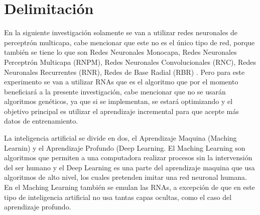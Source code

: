 \section{Delimitación}
\label{sec:delimitation}

    En la siguiente investigación solamente se van a utilizar redes neuronales de perceptr\'on multicapa, 
    cabe mencionar que este no es el único tipo de red, porque también se tiene lo que son Redes Neuronales Monocapa,
    Redes Neuronales Perceptrón Multicapa (RNPM), Redes Neuronales Convolucionales (RNC), Redes Neuronales Recurrentes (RNR),
    Redes de Base Radial (RBR) \cite{royo2021}. Pero para este experimento se van a utilizar RNAs que es el algoritmo que 
    por el momento beneficiar\'a a la presente investigación, cabe mencionar que no se usar\'an algoritmos genéticos, 
    ya que si se implementan, se estará optimizando y el objetivo principal es utilizar el aprendizaje incremental 
    para que acepte más datos de entrenamiento.
    
    La inteligencia artificial se divide en dos, el Aprendizaje Maquina (Maching Learnin) y el Aprendizaje 
    Profundo (Deep Learning. El Maching Learning son algoritmos que permiten a una computadora realizar 
    procesos sin la intervensi\'on del ser humano y el Deep Learning es una parte del aprendizaje maquina
    que usa algoritmos de alto nivel, los cuales pretenden imitar una red neuronal humana. En el Maching Learning
    tambi\'en se emulan las RNAs, a excepci\'on de que en este tipo de inteligencia artificial no usa tantas
    capas ocultas, como el caso del aprendizaje profundo.
